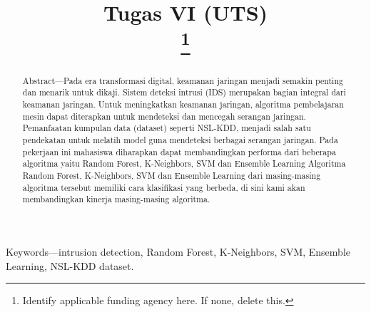 \documentclass[conference]{IEEEtran}
\begin{document}
\title{Tugas VI (UTS)\\
{\footnotesize \textsuperscript{}}
\thanks{Identify applicable funding agency here. If none, delete this.}
}

\author{
}

\maketitle

\begin{abstract}
Abstract—Pada era transformasi digital, keamanan jaringan
menjadi semakin penting dan menarik untuk dikaji. Sistem
deteksi intrusi (IDS) merupakan bagian integral dari keamanan jaringan. Untuk meningkatkan keamanan jaringan, algoritma pembelajaran mesin dapat diterapkan untuk mendeteksi
dan mencegah serangan jaringan. Pemanfaatan kumpulan data
(dataset) seperti NSL-KDD, menjadi salah satu pendekatan untuk melatih model guna mendeteksi berbagai serangan jaringan.
Pada pekerjaan ini mahasiswa diharapkan dapat membandingkan performa dari beberapa algoritma yaitu Random Forest,
K-Neighbors, SVM dan Ensemble Learning
Algoritma Random Forest, K-Neighbors, SVM dan Ensemble
Learning dari masing-masing algoritma tersebut memiliki cara
klasifikasi yang berbeda, di sini kami akan membandingkan
kinerja masing-masing algoritma.

\end{abstract}

\begin{IEEEkeywords}
Keywords—intrusion detection, Random Forest, K-Neighbors,
SVM, Ensemble Learning, NSL-KDD dataset.
\end{IEEEkeywords}
\end{document}
